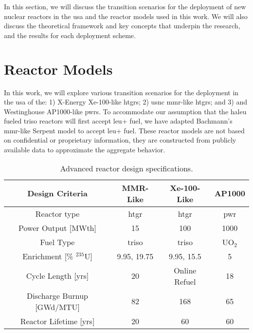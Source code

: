 In this section, we will discuss the transition scenarios for the deployment of new nuclear reactors in the \gls{usa} and the reactor models used in this work. We will also discuss the theoretical framework and key concepts that underpin the research, and the results for each deployment scheme.

\section{Reactor Models}
\label{sec:reactor_models}

In this work, we will explore various transition scenarios for the deployment in the \gls{usa} of the: 1) X-Energy Xe-100-like \glspl{htgr}; 2) \gls{usnc} \gls{mmr}-like \glspl{htgr}; and 3) and Westinghouse AP1000-like \glspl{pwr}. To accommodate our assumption that the \gls{haleu} fueled \gls{triso} reactors will first accept \gls{leu+} fuel, we have adapted Bachmann's \gls{mmr}-like Serpent model \cite{bachmann_mmr_like_2023} to accept \gls{leu+} fuel. These reactor models are not based on confidential or proprietary information, they are constructed from publicly available data to approximate the aggregate behavior.

\begin{table}[htbp]
   \centering
   \caption{Advanced reactor design specifications.}
   \label{tab:ar_defs}
   \begin{tabular}{c c c c}
      \hline
      \textbf{Design Criteria} & \textbf{MMR-Like} \cite{usnc_design_2021} & \textbf{Xe-100-Like} \cite{nuscale_chapter_2018} & \textbf{AP1000} \\
      \hline
      Reactor type & \gls{htgr} & \gls{htgr} & \gls{pwr} \\
      Power Output [MWth] & 15 & 100 & 1000 \\
      Fuel Type & \gls{triso} & \gls{triso} & UO$_2$ \\
      Enrichment [\% $^{235}$U] & 9.95, 19.75 & 9.95, 15.5 & 5 \\
      Cycle Length [yrs] & 20 & Online Refuel & 18 \\
      Discharge Burnup [GWd/MTU] & 82 & 168 & 65 \\
      Reactor Lifetime [yrs] & 20 & 60 & 60 \\
      \hline
   \end{tabular}
\end{table}

